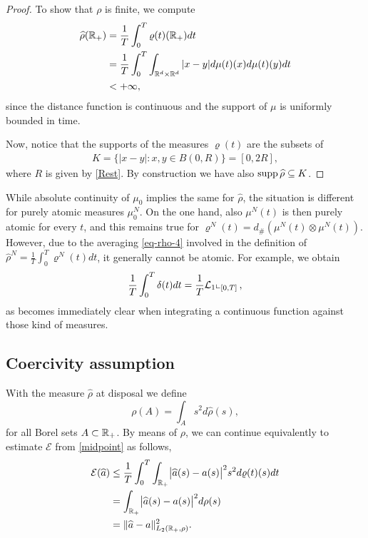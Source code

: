 \begin{proof}
To show that $\rho$ is finite, we compute
\begin{align*}
\begin{split}
\widehat \rho(\mathbb{R}_+)&= \frac{1}{T}\int_0^T \varrho(t)(\mathbb{R}_+)dt \\
&= \frac{1}{T}\int_0^T \int_{\mathbb{R}^d \times \mathbb{R}^d} |x - y| d\mu(t)(x) d \mu(t)(y)dt\\
&<+\infty,
\end{split}
\end{align*}
since the distance function is continuous and the support of $\mu$ is uniformly bounded in time.

	Now, notice that the supports of the measures $\varrho(t)$ are the subsets of
	\begin{align*}
	K=\{|x-y|:x,y\in B(0,R)\} = [0,2R],
	\end{align*}
	where $R$ is given by \eqref{Rest}. By construction we have also
	$\operatorname{supp} \widehat \rho\subseteq K$.
\end{proof}

\begin{remark}
	While absolute continuity of $\mu_0$ implies the same for $\widehat \rho$, the situation is different for purely atomic
	measures $\mu_0^N$. On the one hand, also $\mu^N(t)$ is then purely atomic for every $t$, and this remains true for
	$\varrho^N(t) = d_\# (\mu^N(t) \otimes \mu^N(t))$. However, due to the averaging \eqref{eq-rho-4} involved in the definition of $\widehat \rho^N=\frac{1}{T} \int_0^T \varrho^N(t) dt$, it generally cannot be atomic. For
	example, we obtain
	\begin{align*}
		\frac{1}{T}\int_0^T\delta(t) dt=\frac{1}{T}\mathcal{L}_1\llcorner_{[0,T]}\,,
	\end{align*}
	as becomes immediately clear when integrating a continuous function against those kind of measures.
\end{remark}

\subsection{Coercivity assumption}\label{sec:coerc}

With the measure $\widehat \rho$ at disposal we define
\begin{equation}\label{finallyrho}
\rho(A) = \int_{A} s^2 d\widehat \rho(s),
\end{equation}
for all Borel sets $A \subset \mathbb{R}_+$. By means of $\rho$, we can continue equivalently to  estimate $\mathcal E$ from \eqref{midpoint} as follows,
\begin{align}
\begin{split}\label{eq-rho-3}
	\mathcal E(\widehat a)&\leq\frac{1}{T}\int_0^T\int_{\mathbb{R}_+}\bigl|\widehat a(s)-a(s)\bigr|^2 s^2 d\varrho(t)(s) dt \\
		&= \int_{\mathbb{R}_+} \bigl|\widehat a(s)-a(s)\bigr|^2 d\rho(s)\\
		&= \|\widehat a-a\|^2_{L_2(\mathbb{R}_+,\rho)}.
\end{split}
\end{align}

